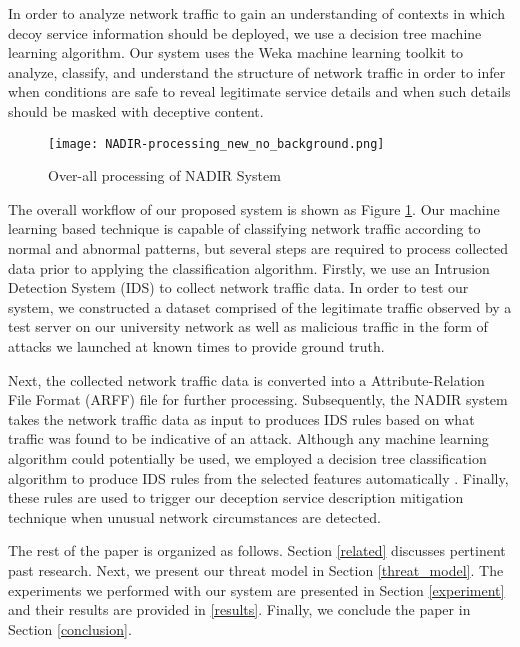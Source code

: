 In order to analyze network traffic to gain an understanding of contexts in which decoy service information should be deployed, we use a decision tree machine learning algorithm. Our system uses the Weka machine learning toolkit \cite{misc:weka} to analyze, classify, and understand the structure of network traffic in order to infer when conditions are safe to reveal legitimate service details and when such details should be masked with deceptive content. 


\begin{figure}[h!]
	\texttt{[image: NADIR-processing\_new\_no\_background.png]}
	\caption{Over-all processing of NADIR System}
	\label{fig:overall}	
\end{figure} 

The overall workflow of our proposed system is shown as Figure \ref{fig:overall}. Our machine learning based technique is capable of classifying network traffic according to normal and abnormal patterns, but several steps are required to process collected data prior to applying the classification algorithm. Firstly, we use an Intrusion Detection System (IDS) to collect network traffic data. In order to test our system, we constructed a dataset comprised of the legitimate traffic observed by a test server on our university network as well as malicious traffic in the form of attacks we launched at known times to provide ground truth. 

Next, the collected network traffic data is converted into a Attribute-Relation File Format (ARFF) file for further processing. Subsequently, the NADIR system takes the network traffic data as input to produces IDS rules based on what traffic was found to be indicative of an attack. Although any machine learning algorithm could potentially be used, we employed a decision tree classification algorithm to produce IDS rules from the selected features automatically \cite{NetData2ARFF}. Finally, these rules are used to trigger our deception service description mitigation technique when unusual network circumstances are detected.

The rest of the paper is organized as follows. Section \ref{related} discusses pertinent past research. Next, we present our threat model in Section \ref{threat_model}. The experiments we performed with our system are presented in Section \ref{experiment} and their results are provided in \ref{results}. Finally, we conclude the paper in Section \ref{conclusion}.


